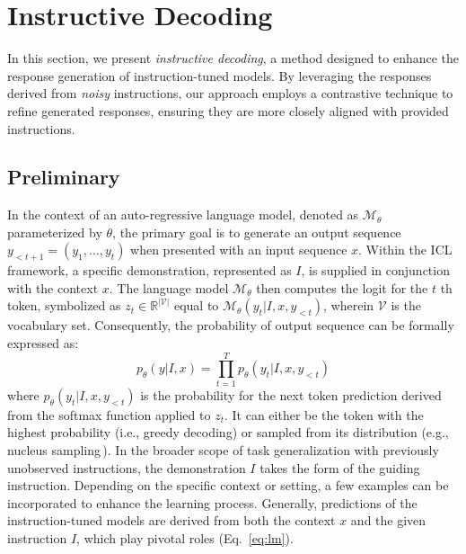 \vspace{-5pt}
\section{Instructive Decoding}\label{sec2:method}
\vspace{-5pt}

In this section, we present \textit{instructive decoding}, a method designed to enhance the response generation of instruction-tuned models. By leveraging the responses derived from \textit{noisy} instructions, our approach employs a contrastive technique to refine generated responses, ensuring they are more closely aligned with provided instructions.

\vspace{-5pt}
\subsection{Preliminary}
\vspace{-5pt}
In the context of an auto-regressive language model, denoted as \( \mathcal{M}_{\theta} \) parameterized by \( \theta \), the primary goal is to generate an output sequence \( y_{<t+1} = (y_1, \ldots, y_t) \) when presented with an input sequence \( x \). Within the ICL framework, a specific demonstration, represented as \(I\), is supplied in conjunction with the context \(x\). The language model \( \mathcal{M}_{\theta}\) then computes the logit for the \(t\) th token, symbolized as $z_t \in \mathbb{R}^\mathcal{|V|}$ equal to $\mathcal{M}_{\theta}(y_t | I, x , y_{<t})$, wherein \(\mathcal{V}\) is the vocabulary set. Consequently, the probability of output sequence can be formally expressed as:
%
\vspace{-5pt}
\begin{equation}\label{eq:lm}
p_{\theta}(y|I, x) = \prod_{t=1}^{T} p_{\theta}(y_{t}|I, x, y_{<t})
\end{equation}
\vspace{-1pt}
%
\noindent where $p_{\theta}(y_{t}|I, x, y_{<t})$ is the probability for the next token prediction derived from the softmax function applied to $z_t$. It can either be the token with the highest probability (i.e., greedy decoding) or sampled from its distribution (e.g., nucleus sampling\,\citep{nucleus_sampling}). In the broader scope of task generalization with previously unobserved instructions, the demonstration \(I\) takes the form of the guiding instruction. Depending on the specific context or setting, a few examples can be incorporated to enhance the learning process. Generally, predictions of the instruction-tuned models are derived from both the context $x$ and the given instruction $I$, which play pivotal roles (Eq.~\ref{eq:lm}).

